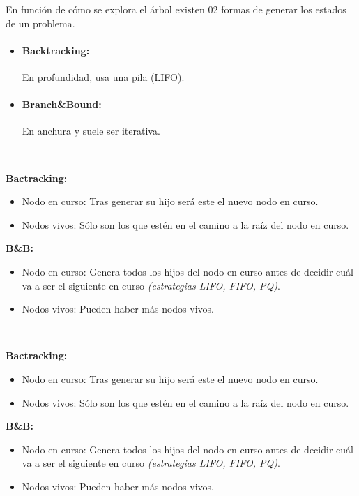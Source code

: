 En función de cómo se explora el árbol existen 02 formas de generar los estados de un problema.

\begin{itemize}
	\item \paragraph{Backtracking:} En profundidad, usa una pila (LIFO).
	\item \paragraph{Branch\&Bound:} En anchura y suele ser iterativa.
\end{itemize}

\begin{theorem}[Diferencias]~

	\textbf{Bactracking:}
	\begin{itemize}
		\item Nodo en curso: Tras generar su hijo será este el nuevo nodo en curso.
		\item Nodos vivos: Sólo son los que estén en el camino a la raíz del nodo en curso.
	\end{itemize}

	\textbf{B\&B:}
	\begin{itemize}
		\item Nodo en curso: Genera todos los hijos del nodo en curso antes de decidir cuál va a ser el siguiente en curso \textit{(estrategias LIFO, FIFO, PQ)}.
		\item Nodos vivos: Pueden haber más nodos vivos.
	\end{itemize}
\end{theorem}

\begin{theorem}[Diferencias]~

	\textbf{Bactracking:}
	\begin{itemize}
		\item Nodo en curso: Tras generar su hijo será este el nuevo nodo en curso.
		\item Nodos vivos: Sólo son los que estén en el camino a la raíz del nodo en curso.
	\end{itemize}

	\textbf{B\&B:}
	\begin{itemize}
		\item Nodo en curso: Genera todos los hijos del nodo en curso antes de decidir cuál va a ser el siguiente en curso \textit{(estrategias LIFO, FIFO, PQ)}.
		\item Nodos vivos: Pueden haber más nodos vivos.
	\end{itemize}
\end{theorem}

